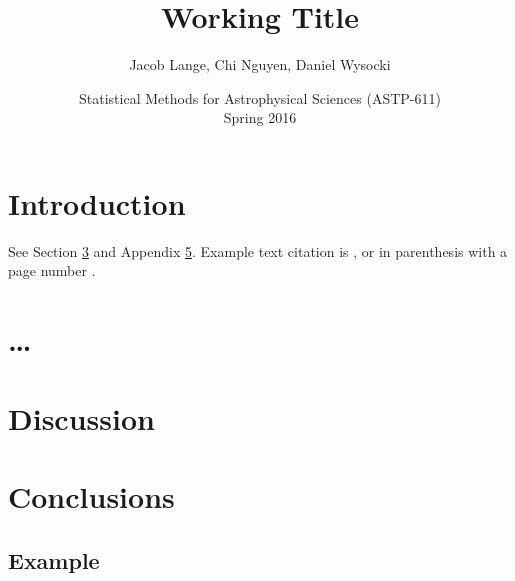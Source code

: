 \documentclass[12pt]{article}
\title{
  Working Title
}
\author{
  Jacob Lange, Chi Nguyen, Daniel Wysocki
}
\date{
  Statistical Methods for Astrophysical Sciences (ASTP-611)
  \\
  Spring 2016
}
\begin{document}
\maketitle


\begin{abstract}


\end{abstract}


\section{Introduction}
\label{sec:intro}

See Section \ref{sec:discussion} and Appendix \ref{app:example}. Example text citation is \textcite{2012ApJ...759...52D}, or in parenthesis with a page number \parencite[pg 2]{2012ApJ...759...52D}.


\section{\ldots}
\label{sec:more}





\section{Discussion}
\label{sec:discussion}




\section{Conclusions}
\label{sec:conclusions}




\printbibliography[heading=subbibliography]

\begin{appendices}

\section{Example}
\label{app:example}


\end{appendices}
\end{document}
